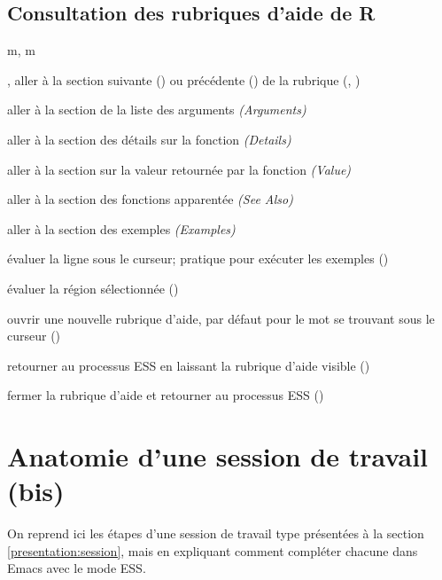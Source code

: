 \subsection{Consultation des rubriques d'aide de R}
\label{emacs+ess:commandes:aide}

\begin{ttscript}{m, m}
  \raggedright
\item[\ess{n}, \ess{p}] aller à la section suivante () ou
  précédente () de la rubrique
  (,
  )
\item[\ess{s a}] aller à la section de la liste des arguments \emph{(Arguments)}
\item[\ess{s D}] aller à la section des détails sur la fonction \emph{(Details)}
\item[\ess{s v}] aller à la section sur la valeur retournée par la
  fonction \emph{(Value)}
\item[\ess{s s}] aller à la section des fonctions apparentée \emph{(See Also)}
\item[\ess{s e}] aller à la section des exemples \emph{(Examples)}
\item[\ess{l}] évaluer la ligne sous le curseur; pratique pour
  exécuter les exemples ()
\item[\ess{r}] évaluer la région sélectionnée ()
\item[\ess{h}] ouvrir une nouvelle rubrique d'aide, par défaut pour le
  mot se trouvant sous le curseur ()
\item[\ess{q}] retourner au processus ESS en laissant la rubrique
  d'aide visible ()
\item[\ess{x}] fermer la rubrique d'aide et retourner au processus ESS
  ()
\end{ttscript}



\section{Anatomie d'une session de travail (bis)}
\label{emacs+ess:session}

On reprend ici les étapes d'une session de travail type présentées à
la section \ref{presentation:session}, mais en expliquant comment
compléter chacune dans Emacs avec le mode ESS.


